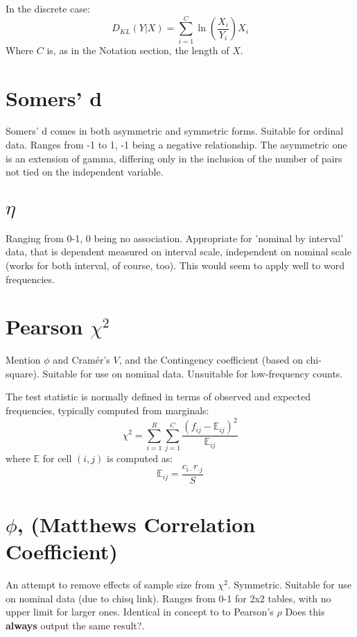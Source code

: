 \documentclass[11pt]{article}
\begin{document}
In the discrete case:
$$
D_{KL}(Y|X) = \sum_{i=1}^{C}{ \ln \left( \frac{X_i}{Y_i} \right) } X_i
$$
Where $C$ is, as in the Notation section, the length of $X$.



\section{Somers' d}
Somers' d comes in both asymmetric and symmetric forms.  Suitable for ordinal data.  Ranges from -1 to 1, -1 being a negative relationship.  The asymmetric one is an extension of gamma, differing only in the inclusion of the number of pairs not tied on the independent variable.




\section{$\eta$}
Ranging from 0-1, 0 being no association.  Appropriate for 'nominal by interval' data, that is dependent measured on interval scale, independent on nominal scale (works for both interval, of course, too).  This would seem to apply well to word frequencies.




\section{Pearson $\chi^2$}
Mention $\phi$ and Cram\'er's $V$, and the Contingency coefficient (based on chi-square).  Suitable for use on nominal data.  Unsuitable for low-frequency counts.

The test statistic is normally defined in terms of observed and expected frequencies, typically computed from marginals:
$$
\chi^2 = \sum_{i=1}^R{  \sum_{j=1}^C{ \frac{ (f_{ij} - \mathbb{E}_{ij} )^2 }{ \mathbb{E}_{ij} } } }
$$
where $\mathbb{E}$ for cell $(i,j)$ is computed as:
$$
\mathbb{E}_{ij} = \frac{ c_{i \cdot} r_{\cdot j} }{ S }
$$


\section{$\phi$, (Matthews Correlation Coefficient)}
\label{section:phi}
An attempt to remove effects of sample size from $\chi^2$.  Symmetric. Suitable for use on nominal data (due to chisq link). %
Ranges from 0-1 for 2x2 tables, with no upper limit for larger ones.  Identical in concept to to Pearson's $\rho$ {\color{red} Does this \textbf{always} output the same result?}.
\end{document}
